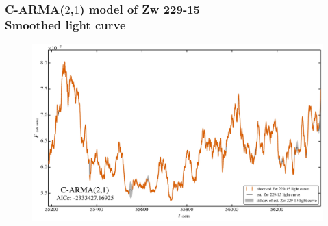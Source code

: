 \documentclass[hyperref={pdfpagelabels=false}]{beamer}
\begin{document}
\begin{frame}
\frametitle{C-ARMA($2$,$1$) model of Zw 229-15\\Smoothed light curve}
  \begin{figure}
    \includegraphics[scale=0.065]{images/Zw229-15_LC.jpg}
  \end{figure}
\end{frame}
\end{document}
